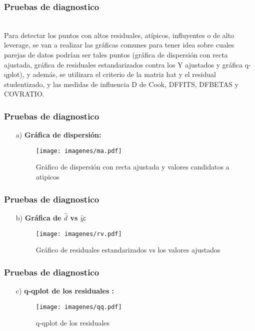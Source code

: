 \documentclass[12pt]{beamer}
\begin{document}
\begin{frame}
\frametitle{Pruebas de diagnostico}
~\\Para detectar los puntos con altos residuales, atípicos, influyentes o de alto leverage, se van a realizar las gráficas comunes para tener idea sobre cuales parejas de datos podrían ser tales puntos (gráfica de dispersión con recta ajustada, gráfica de residuales estandarizados contra los Y ajustados y gráfica q-qplot), y además, se utilizara el criterio de la matriz hat y el residual studentizado, y las medidas de influencia D de Cook, DFFITS, DFBETAS y COVRATIO.
\end{frame}

\begin{frame}
\frametitle{Pruebas de diagnostico}
\begin{itemize}
\item[a)] \textbf{Gráfica de dispersión:}
\begin{figure}[h]
  \centering
  \texttt{[image: imagenes/ma.pdf]}
  \caption{Gráfico de dispersión con recta ajustada y valores candidatos a atipicos}\label{figura1}
\end{figure}
\end{itemize}
\end{frame}

\begin{frame}
\frametitle{Pruebas de diagnostico}
\begin{itemize}
\item[b)] \textbf{Gráfica de $\hat{d}$ vs $\hat{y}$:}
\begin{figure}[h]
  \centering
  \texttt{[image: imagenes/rv.pdf]}
  \caption{Gráfico de residuales estandarizados vs los valores ajustados}\label{figura1}
\end{figure}
\end{itemize}
\end{frame}

\begin{frame}
\frametitle{Pruebas de diagnostico}
\begin{itemize}
\item[c)] \textbf{q-qplot de los residuales :}
\begin{figure}[h]
  \centering
  \texttt{[image: imagenes/qq.pdf]}
  \caption{q-qplot de los residuales}\label{figura1}
\end{figure}
\end{itemize}
\end{frame}
\end{document}
